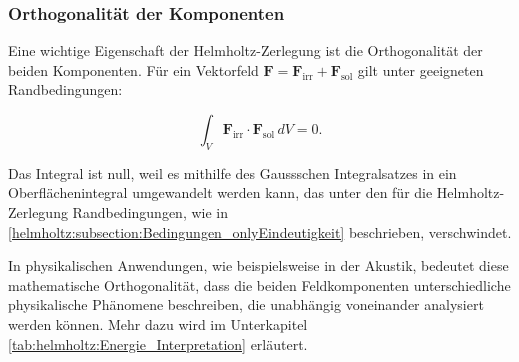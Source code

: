 \subsubsection{Orthogonalität der Komponenten}

Eine wichtige Eigenschaft der Helmholtz-Zerlegung ist die Orthogonalität der beiden Komponenten. Für ein Vektorfeld $\mathbf{F} = \mathbf{F}_{\text{irr}} + \mathbf{F}_{\text{sol}}$ gilt unter geeigneten Randbedingungen:

\begin{equation}
\int_V \mathbf{F}_{\text{irr}} \cdot \mathbf{F}_{\text{sol}} \, dV = 0.
\end{equation}

\noindent Das Integral ist null, weil es mithilfe des Gaussschen Integralsatzes in ein Oberflächenintegral umgewandelt werden kann, das unter den für die Helmholtz-Zerlegung Randbedingungen, wie in \ref{helmholtz:subsection:Bedingungen_onlyEindeutigkeit} beschrieben, verschwindet.
 
 
\noindent In physikalischen Anwendungen, wie beispielsweise in der Akustik, bedeutet diese mathematische Orthogonalität, dass die beiden Feldkomponenten unterschiedliche physikalische Phänomene beschreiben, die unabhängig voneinander analysiert werden können. Mehr dazu wird im Unterkapitel \ref{tab:helmholtz:Energie_Interpretation} erläutert.


